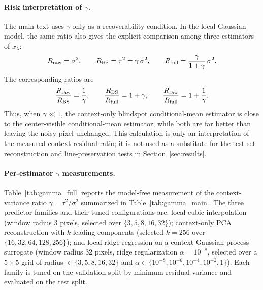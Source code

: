 \documentclass[twocolumn]{aastex7}
\begin{document}
\paragraph{Risk interpretation of $\gamma$.}
\label{app:gamma_risk_interpretation}
The main text uses $\gamma$ only as a recoverability condition. In the local Gaussian model, the same ratio also gives the explicit comparison among three estimators of $x_{\lambda}$:
\[
    R_{\rm raw} = \sigma^{2},
    \qquad
    R_{\rm BS} = \tau^{2} = \gamma\,\sigma^{2},
    \qquad
    R_{\rm full} = \frac{\gamma}{1+\gamma}\,\sigma^{2}.
\]
The corresponding ratios are
\[
    \frac{R_{\rm raw}}{R_{\rm BS}} = \frac{1}{\gamma},
    \qquad
    \frac{R_{\rm BS}}{R_{\rm full}} = 1+\gamma,
    \qquad
    \frac{R_{\rm raw}}{R_{\rm full}} = 1 + \frac{1}{\gamma}.
\]
Thus, when $\gamma\ll1$, the context-only blindspot conditional-mean estimator is close to the center-visible conditional-mean estimator, while both are far better than leaving the noisy pixel unchanged. This calculation is only an interpretation of the measured context-residual ratio; it is not used as a substitute for the test-set reconstruction and line-preservation tests in Section~\ref{sec:results}.

\paragraph{Per-estimator $\gamma$ measurements.}
Table~\ref{tab:gamma_full} reports the model-free measurement of the context-variance ratio $\gamma=\tau^{2}/\sigma^{2}$ summarized in Table~\ref{tab:gamma_main}. The three predictor families and their tuned configurations are: local cubic interpolation (window radius $3$ pixels, selected over $\{3,5,8,16,32\}$); context-only PCA reconstruction with $k$ leading components (selected $k=256$ over $\{16,32,64,128,256\}$); and local ridge regression on a context Gaussian-process surrogate (window radius $32$ pixels, ridge regularization $\alpha=10^{-8}$, selected over a $5\times5$ grid of radius $\in\{3,5,8,16,32\}$ and $\alpha\in\{10^{-8},10^{-6},10^{-4},10^{-2},1\}$). Each family is tuned on the validation split by minimum residual variance and evaluated on the test split.
\end{document}
